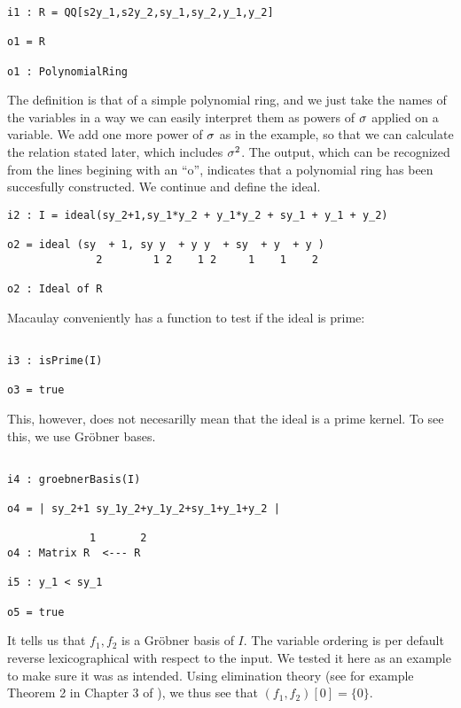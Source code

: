 \begin{lstlisting}
i1 : R = QQ[s2y_1,s2y_2,sy_1,sy_2,y_1,y_2]

o1 = R

o1 : PolynomialRing

\end{lstlisting}

The definition is that of a simple polynomial ring, and we just take the names of the variables in a way we can easily interpret them as powers of $\sigma$ applied on a variable. We add one more power of $\sigma$ as in the example, so that we can calculate the relation stated later, which includes $\sigma^2$.
The output, which can be recognized from the lines begining with an ``o'', indicates that a polynomial ring has been succesfully constructed. We continue and define the ideal.

\begin{lstlisting}
i2 : I = ideal(sy_2+1,sy_1*y_2 + y_1*y_2 + sy_1 + y_1 + y_2)

o2 = ideal (sy  + 1, sy y  + y y  + sy  + y  + y )
              2        1 2    1 2     1    1    2

o2 : Ideal of R

\end{lstlisting}

Macaulay conveniently has a function to test if the ideal is prime: 

\begin{lstlisting}

i3 : isPrime(I)

o3 = true

\end{lstlisting}

This, however, does not necesarilly mean that the ideal is a prime kernel. To see this, we use Gr\"{o}bner bases.

\begin{lstlisting}

i4 : groebnerBasis(I)

o4 = | sy_2+1 sy_1y_2+y_1y_2+sy_1+y_1+y_2 |

             1       2
o4 : Matrix R  <--- R

i5 : y_1 < sy_1

o5 = true

\end{lstlisting}

It tells us that $f_1, f_2$ is a Gr\"{o}bner basis of $I$.
The variable ordering is per default reverse lexicographical with respect to the input.  
We tested it here as an example to make sure it was as intended.
Using elimination theory (see for example Theorem 2 in Chapter 3 of \cite{cox}),
we thus see that $(f_1,f_2)[0] = \{0\}$.


